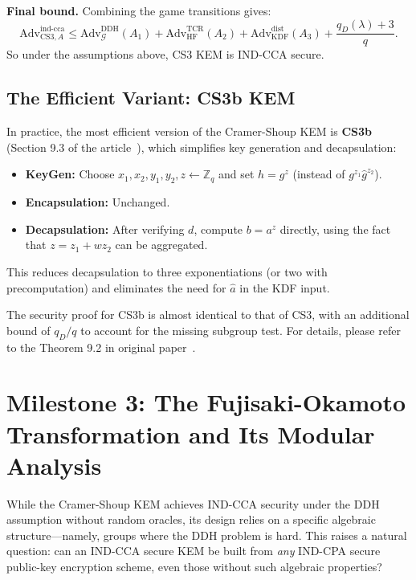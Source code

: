 \vspace{0.5em}
\noindent\textbf{Final bound.} 
Combining the game transitions gives:
$$
\text{Adv}_{\text{CS3},A}^{\text{ind-cca}} \le \text{Adv}_{\mathcal{G}}^{\text{DDH}}(A_1) + \text{Adv}_{\mathrm{HF}}^{\text{TCR}}(A_2) + \text{Adv}_{\mathrm{KDF}}^{\text{dist}}(A_3) + \frac{q_D(\lambda) + 3}{q}.
$$
So under the assumptions above, CS3 KEM is IND-CCA secure.

\subsection{The Efficient Variant: CS3b KEM}

In practice, the most efficient version of the Cramer-Shoup KEM is \textbf{CS3b} (Section 9.3 of the article~\cite{cramer2003design}), which simplifies key generation and decapsulation:

\begin{itemize}
    \item \textbf{KeyGen:} Choose $x_1, x_2, y_1, y_2, z \gets \mathbb{Z}_q$ and set $h = g^z$ (instead of $g^{z_1} \hat{g}^{z_2}$).
    \item \textbf{Encapsulation:} Unchanged.
    \item \textbf{Decapsulation:} After verifying $d$, compute $b = a^z$ directly, using the fact that $z = z_1 + w z_2$ can be aggregated.
\end{itemize}

This reduces decapsulation to three exponentiations (or two with precomputation) and eliminates the need for $\hat{a}$ in the KDF input.

The security proof for CS3b is almost identical to that of CS3, with an additional bound of $q_D / q$ to account for the missing subgroup test. For details, please refer to the Theorem 9.2 in original paper~\cite{cramer2003design}.

\section{Milestone 3: The Fujisaki-Okamoto Transformation and Its Modular Analysis}

While the Cramer-Shoup KEM achieves IND-CCA security under the DDH assumption without random oracles, its design relies on a specific algebraic structure---namely, groups where the DDH problem is hard. This raises a natural question: can an IND-CCA secure KEM be built from \textit{any} IND-CPA secure public-key encryption scheme, even those without such algebraic properties?

